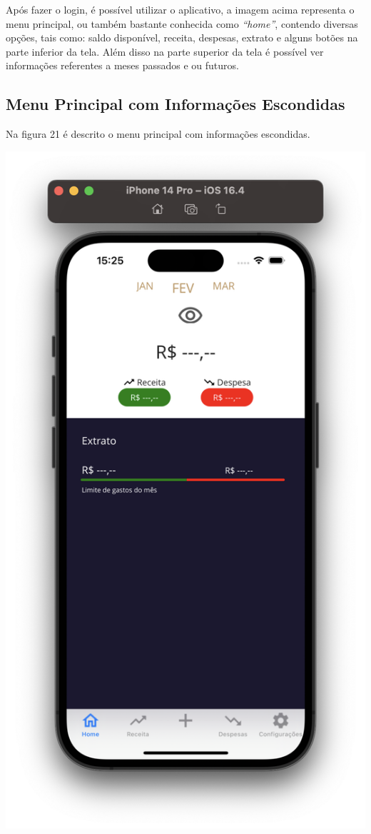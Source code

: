 Após fazer o login, é possível utilizar o aplicativo, a imagem acima representa o menu principal, ou também bastante conhecida como \textit{“home”}, contendo diversas opções, tais como: saldo disponível, receita, despesas, extrato e alguns botões na parte inferior da tela. Além disso na parte superior da tela é possível ver informações referentes a meses passados e ou futuros. 

\subsection{Menu Principal com Informações Escondidas}

Na figura 21 é descrito o menu principal com informações escondidas.

    \vspace{\baselineskip}
    \begin{center}
        \begin{minipage}{\textwidth}
            \centering
            \includegraphics[scale=0.2]{figs/figura21.png}

\end{minipage}
\end{center}
